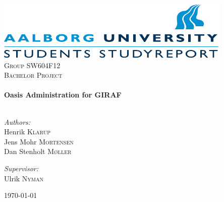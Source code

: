 \begin{titlepage}

\begin{center}

\includegraphics[width=\textwidth]{Images/aau_logo_en.pdf}\\[1cm]    

\textsc{\LARGE Group SW604F12}\\[1.5cm]

\textsc{\Large Bachelor Project}\\[0.5cm]


\HRule \\[0.4cm]
{ \huge \bfseries Oasis Administration for GIRAF}\\[0.4cm]

\HRule \\[1.5cm]

\begin{minipage}{0.4\textwidth}
\begin{flushleft} \large
\vspace{1.25cm}
\emph{Authors:}\\
Henrik \textsc{Klarup} \\
Jens Mohr \textsc{Mortensen} \\
Dan Stenholt \textsc{M\o{}ller}
\end{flushleft}
\end{minipage}
\begin{minipage}{0.4\textwidth}
\begin{flushright} \large
\emph{Supervisor:} \\
Ulrik \textsc{Nyman}
\end{flushright}
\end{minipage}

\vfill

{\large \today}

\end{center}

\end{titlepage}

